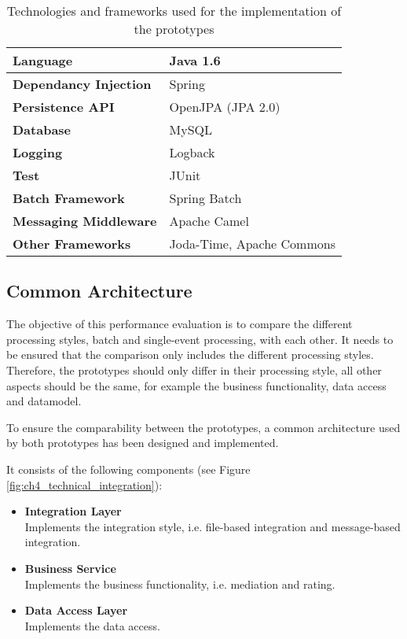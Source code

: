 \begin{table}
	\centering
	\begin{tabularx}{\textwidth}{@{} l X @{}}
		\caption{Technologies and frameworks used for the implementation of the prototypes} \label{table:ch4_frameworks}\\
		\toprule
		\bfseries Language & Java 1.6\\
		\midrule
		\bfseries Dependancy Injection & Spring\\
		\midrule
		\bfseries Persistence API & OpenJPA (JPA 2.0)\\
		\midrule
		\bfseries Database & MySQL\\
		\midrule
		\bfseries Logging & Logback\\
		\midrule
		\bfseries Test & JUnit\\
		\midrule
		\bfseries Batch Framework & Spring Batch\\
		\midrule
		\bfseries Messaging Middleware & Apache Camel\\
		\midrule
		\bfseries Other Frameworks & Joda-Time, Apache Commons\\
		\bottomrule
	\end{tabularx}
\end{table}

\subsection{Common Architecture} %
\label{sub:ch4_common_architecture}

The objective of this performance evaluation is to compare the different processing styles, batch and single-event processing, with each other.
It needs to be ensured that the comparison only includes the different processing styles. Therefore, the prototypes should only differ in their processing style, all other aspects should be the same, for example the business functionality, data access and datamodel.

To ensure the comparability between the prototypes, a common architecture used by both prototypes has been designed and implemented.

It consists of the following components (see Figure \ref{fig:ch4_technical_integration}):

\begin{itemize}
	\item \textbf{Integration Layer}\\
	Implements the integration style, i.e. file-based integration and message-based integration.
	\item \textbf{Business Service}\\
	Implements the business functionality, i.e. mediation and rating.
	\item \textbf{Data Access Layer}\\Implements the data access.
\end{itemize}

